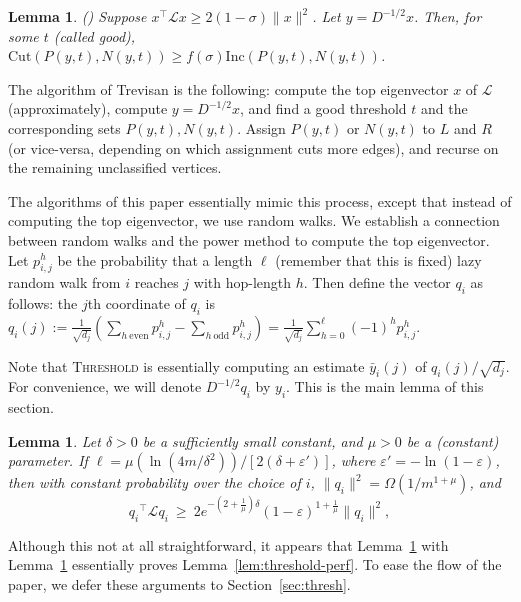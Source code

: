 \documentclass[11pt]{article}
\newtheorem{Lem}[theorem]{Lemma}
\def\epsilon{\varepsilon}
\def\lap{{\mathcal L}}
\newcommand\qi{q_i}
\newcommand\qbi{\bar{y}_i}
\newcommand\halfqi{y_i}
\newcommand\inc{\textrm{Inc}}
\newcommand\cut{\textrm{Cut}}
\newcommand\Threshold{\textsc{Threshold}\xspace}
\newcommand\soto{f\xspace}
\def\Dhalfinv{D^{-1/2}}
\begin{document}
\begin{Lem}\label{lem:soto} (\cite{Sot09}) Suppose $x^\top \lap x \geq 2(1-\sigma) \|x\|^2$.
Let $y = \Dhalfinv x$.
Then, for some $t$ (called \emph{good}),
$\cut(P(y,t),N(y,t)) \geq \soto(\sigma) \inc(P(y,t),N(y,t))$.
\end{Lem}

The algorithm of Trevisan is the following: compute the top eigenvector $x$ of $\lap$ (approximately), compute $y = \Dhalfinv x$, and find a good threshold $t$ and the corresponding sets $P(y, t), N(y, t)$. Assign $P(y, t)$ or $N(y, t)$ to $L$ and $R$ (or vice-versa, depending on which assignment cuts more edges), and recurse on the remaining unclassified vertices.

The algorithms of this paper essentially mimic this process, except that
instead of computing the top eigenvector, we use random walks. We establish a
connection between random walks and the power method to compute the top
eigenvector. Let $p_{i,j}^h$ be the probability that a length $\ell$ (remember that this
is fixed) lazy
random walk from $i$ reaches $j$ with hop-length $h$. Then define the vector
$\qi$ as follows: the $j$th coordinate of $\qi$ is $ \qi(j) :=
\frac{1}{\sqrt{d_j}}\left( \sum_{h \ \textrm{even}} p_{i,j}^h - \sum_{h \
\textrm{odd}} p_{i,j}^h \right) = \frac{1}{\sqrt{d_j}}\sum_{h = 0}^\ell (-1)^h
p_{i,j}^h.$

Note that {\Threshold} is essentially computing an estimate $\qbi(j)$
of $\qi(j)/\sqrt{d_j}$. For convenience, we will denote $\Dhalfinv \qi$ by $\halfqi$.
This is the main lemma of this section.
\begin{Lem}\label{lem:good-q}
Let $\delta > 0$ be a sufficiently small constant, and $\mu > 0$ be
a (constant) parameter.
If $\ell = \mu(\ln (4m/\delta^2))/[2(\delta + \epsilon')]$, where $\epsilon' = -\ln(1-\epsilon)$, then
with constant probability over the choice of $i$,
$\| \qi \|^2 = \Omega(1/m^{1+\mu})$, and
\begin{equation} \label{eq:lap-q}
{\qi}^\top \lap {\qi}\ \geq\ 2e^{-(2 + \frac{1}{\mu})\delta}(1 - \epsilon)^{1 + \frac{1}{\mu}}\|{\qi}\|^2,
\end{equation}
\end{Lem}

Although this not at all straightforward, it appears that Lemma~\ref{lem:good-q}
with Lemma~\ref{lem:soto} essentially proves Lemma~\ref{lem:threshold-perf}.
To ease the flow of the paper, we defer these arguments to Section~\ref{sec:thresh}.
\end{document}
